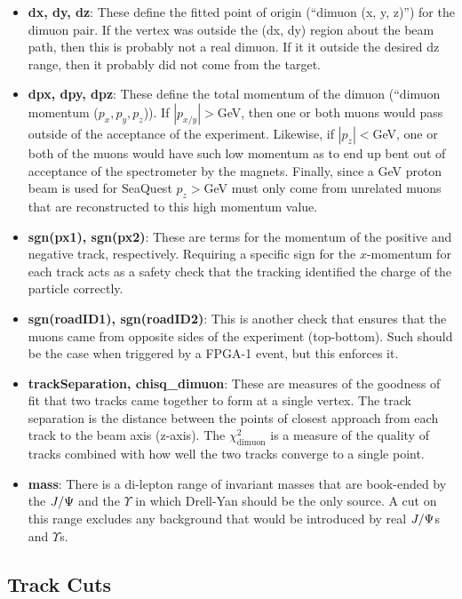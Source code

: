 \begin{itemize}
	\item \textbf{dx, dy, dz}: These define the fitted point of origin (``dimuon (x, y, z)'') for the dimuon pair. If the vertex was outside the (dx, dy) region about the beam path, then this is probably not a real dimuon. If it it outside the desired dz range, then it probably did not come from the target.
	\item \textbf{dpx, dpy, dpz}: These define the total momentum of the dimuon (``dimuon momentum ($p_x, p_y, p_z$)). If $|p_{x/y}|>$\unit[2]{GeV}, then one or both muons would pass outside of the acceptance of the experiment. Likewise, if $|p_{z}|<$\unit[30]{GeV}, one or both of the muons would have such low momentum as to end up bent out of acceptance of the spectrometer by the magnets. Finally, since a \unit[120]{GeV} proton beam is used for SeaQuest $p_{z}>$\unit[120]{GeV} must only come from unrelated muons that are reconstructed to this high momentum value.
	\item \textbf{sgn(px1), sgn(px2)}: These are terms for the momentum of the positive and negative track, respectively. Requiring a specific sign for the $x$-momentum for each track acts as a safety check that the tracking identified the charge of the particle correctly.
	\item \textbf{sgn(roadID1), sgn(roadID2)}: This is another check that ensures that the muons came from opposite sides of the experiment (top-bottom). Such should be the case when triggered by a FPGA-1 event, but this enforces it.
	\item \textbf{trackSeparation, chisq\_dimuon}: These are measures of the goodness of fit that two tracks came together to form at a single vertex. The track separation is the distance between the points of closest approach from each track to the beam axis (z-axis). The $\chi^2_{\text{dimuon}}$ is a measure of the quality of tracks combined with how well the two tracks converge to a single point.
	\item \textbf{mass}: There is a di-lepton range of invariant masses that are book-ended by the $J/\Psi$ and the $\Upsilon$ in which Drell-Yan should be the only source. A cut on this range excludes any background that would be introduced by real $J/\Psi$s and $\Upsilon$s.
\end{itemize}

\subsection{Track Cuts}

